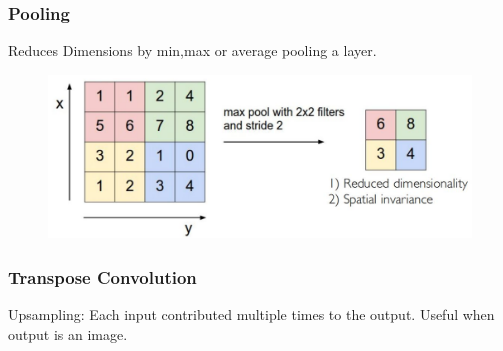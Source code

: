  \subsubsection{Pooling}
 Reduces Dimensions by min,max or average pooling a layer.
 \begin{figure}[!h]
    \includegraphics[width = \columnwidth]{figures/06/Pooling.png}
 \end{figure}
 \subsubsection{Transpose Convolution}
 Upsampling: Each input contributed multiple times to the output.
 Useful when output is an image.